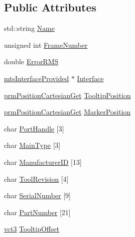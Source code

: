 \subsection*{Public Attributes}
\begin{DoxyCompactItemize}
\item 
std\-::string \hyperlink{classmts_n_d_i_serial_1_1_tool_a4c87311466326771f75531a83935c208}{Name}
\item 
unsigned int \hyperlink{classmts_n_d_i_serial_1_1_tool_a310bebd3b9eda41d482edbb983195a10}{Frame\-Number}
\item 
double \hyperlink{classmts_n_d_i_serial_1_1_tool_ad4282be66b1ffaf250d51fb9305395e7}{Error\-R\-M\-S}
\item 
\hyperlink{classmts_interface_provided}{mts\-Interface\-Provided} $\ast$ \hyperlink{classmts_n_d_i_serial_1_1_tool_ae39df6f4194b4be33310019ccee4bf73}{Interface}
\item 
\hyperlink{classprm_position_cartesian_get}{prm\-Position\-Cartesian\-Get} \hyperlink{classmts_n_d_i_serial_1_1_tool_aef4e9c123a79afda4c764d27faeac338}{Tooltip\-Position}
\item 
\hyperlink{classprm_position_cartesian_get}{prm\-Position\-Cartesian\-Get} \hyperlink{classmts_n_d_i_serial_1_1_tool_ab8a5ef4c88fdb0420aff4ef6354570bf}{Marker\-Position}
\item 
char \hyperlink{classmts_n_d_i_serial_1_1_tool_a9b445b958cbf2eb2058d1eb56df30da5}{Port\-Handle} \mbox{[}3\mbox{]}
\item 
char \hyperlink{classmts_n_d_i_serial_1_1_tool_a3b9ca4cfc7d81dc34e483a96e4a86056}{Main\-Type} \mbox{[}3\mbox{]}
\item 
char \hyperlink{classmts_n_d_i_serial_1_1_tool_ade34454fc0c511fefd3cd5db7332734b}{Manufacturer\-I\-D} \mbox{[}13\mbox{]}
\item 
char \hyperlink{classmts_n_d_i_serial_1_1_tool_aadd9c102dca4f53e5ea50188ddebc9e0}{Tool\-Revision} \mbox{[}4\mbox{]}
\item 
char \hyperlink{classmts_n_d_i_serial_1_1_tool_a454c6a43d24c1b0e50ff94b3f43e272a}{Serial\-Number} \mbox{[}9\mbox{]}
\item 
char \hyperlink{classmts_n_d_i_serial_1_1_tool_a80a1f0ea33d2f23349edb5fc58a4c388}{Part\-Number} \mbox{[}21\mbox{]}
\item 
\hyperlink{vct_fixed_size_vector_types_8h_a3af82acdbf4eeb73c551909240b106ea}{vct3} \hyperlink{classmts_n_d_i_serial_1_1_tool_aa8acfe8b5a76a1fc7816233d6f853049}{Tooltip\-Offset}
\end{DoxyCompactItemize}


